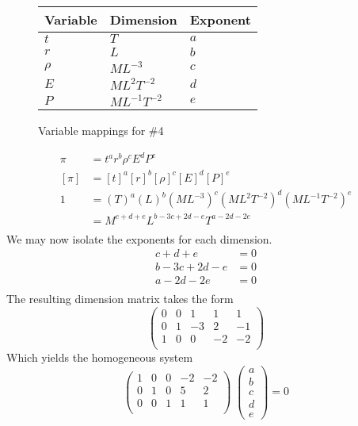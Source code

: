 \documentclass[12pt,twoside]{article}
\begin{document}
  \begin{figure}
    \centering
    \begin{tabularx}{0.5\textwidth}{XXX}
      Variable & Dimension & Exponent \\ \midrule
      $t$ & $T$ & $a$ \\
      $r$ & $L$ & $b$ \\
      $\rho$ & $ML^{-3}$ & $c$ \\
      $E$ & $ML^{2}T^{-2}$ & $d$ \\
      $P$ & $ML^{-1}T^{-2}$ & $e$ \\
    \end{tabularx}
    \caption{Variable mappings for \#4}
\label{fig:4-var-mappings}
  \end{figure}
  \begin{equation*}
    \begin{aligned}
      \pi &= {t}^a {r}^b {\rho}^c {E}^d {P}^e \\
      [\pi] &= {[t]}^a {[r]}^b {[\rho]}^c {[E]}^d {[P]}^e \\
      1 &= {(T)}^a{(L)}^b{(ML^{-3})}^c{(ML^2T^{-2})}^d{(ML^{-1}T^{-2})}^e \\
      &= M^{c+d+e}L^{b-3c+2d-e}T^{a-2d-2e} \\
    \end{aligned}
  \end{equation*}
  We may now isolate the exponents for each dimension.
  \begin{equation*}
    \begin{aligned}
      c + d + e &= 0 \\
      b - 3c + 2d - e &= 0 \\
      a - 2d - 2e &= 0 \\
    \end{aligned}
  \end{equation*}
  The resulting dimension matrix takes the form
  \begin{equation*}
    \begin{pmatrix}
      0 & 0 & 1 & 1 & 1 \\
      0 & 1 & -3 & 2 & -1 \\
      1 & 0 & 0 & -2 & -2 \\
    \end{pmatrix}
  \end{equation*}
  Which yields the homogeneous system
  \begin{equation*}
    \begin{pmatrix}
      1 & 0 & 0 & -2 & -2 \\
      0 & 1 & 0 & 5 & 2 \\
      0 & 0 & 1 & 1 & 1 \\
    \end{pmatrix} \;
    \begin{pmatrix}
      a \\ b \\ c \\ d \\ e
    \end{pmatrix}
    = 0
  \end{equation*}
\end{document}
